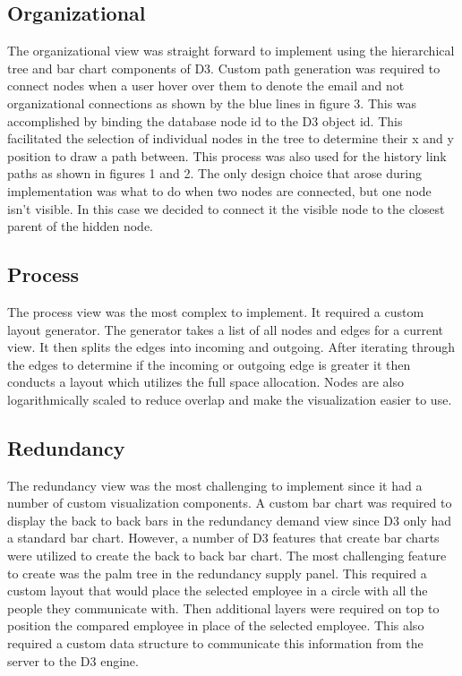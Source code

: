 \documentclass[journal]{vgtc}                %
\begin{document}
\subsection{Organizational}
The organizational view was straight forward to implement using the hierarchical tree and bar chart components of D3.  Custom path generation was required to connect nodes when a user hover over them to denote the email and not organizational connections as shown by the blue lines in figure 3.  This was accomplished by binding the database node id to the D3 object id.  This facilitated the selection of individual nodes in the tree to determine their x and y position to draw a path between.  This process was also used for the history link paths as shown in figures 1 and 2.
The only design choice that arose during implementation was what to do when two nodes are connected, but one node isn't visible.  In this case we decided to connect it the visible node to the closest parent of the hidden node.

\subsection{Process}
The process view was the most complex to implement.  It required a custom layout generator.  The generator takes a list of all nodes and edges for a current view.  It then splits the edges into incoming and outgoing.  After iterating through the edges to determine if the incoming or outgoing edge is greater it then conducts a layout which utilizes the full space allocation.  Nodes are also logarithmically scaled to reduce overlap and make the visualization easier to use.

\subsection{Redundancy}
The redundancy view was the most challenging to implement since it had a number of custom visualization components.  A custom bar chart was required to display the back to back bars in the redundancy demand view since D3 only had a standard bar chart.  However, a number of D3 features that create bar charts were utilized to create the back to back bar chart.  
The most challenging feature to create was the palm tree in the redundancy supply panel.  This required a custom layout that would place the selected employee in a circle with all the people they communicate with.  Then additional layers were required on top to position the compared employee in place of the selected employee.  This also required a custom data structure to communicate this information from the server to the D3 engine.
\end{document}
